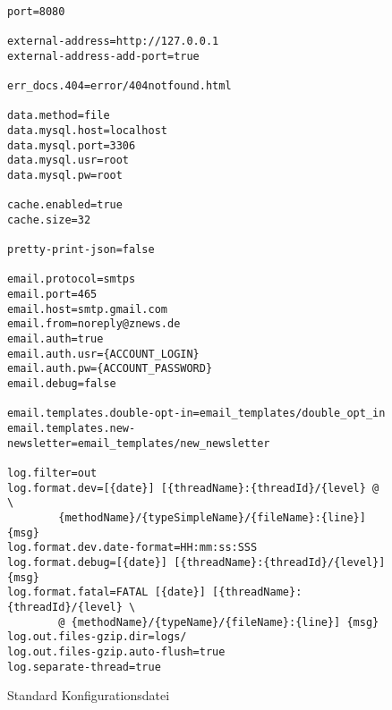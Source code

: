 \begin{figure}[p]
    \centering
    \begin{lstlisting}[frame=single,language=incomplete-Ini]%formatter:off

port=8080

external-address=http://127.0.0.1
external-address-add-port=true

err_docs.404=error/404notfound.html

data.method=file
data.mysql.host=localhost
data.mysql.port=3306
data.mysql.usr=root
data.mysql.pw=root

cache.enabled=true
cache.size=32

pretty-print-json=false

email.protocol=smtps
email.port=465
email.host=smtp.gmail.com
email.from=noreply@znews.de
email.auth=true
email.auth.usr={ACCOUNT_LOGIN}
email.auth.pw={ACCOUNT_PASSWORD}
email.debug=false

email.templates.double-opt-in=email_templates/double_opt_in
email.templates.new-newsletter=email_templates/new_newsletter

log.filter=out
log.format.dev=[{date}] [{threadName}:{threadId}/{level} @ \
        {methodName}/{typeSimpleName}/{fileName}:{line}] {msg}
log.format.dev.date-format=HH:mm:ss:SSS
log.format.debug=[{date}] [{threadName}:{threadId}/{level}] {msg}
log.format.fatal=FATAL [{date}] [{threadName}:{threadId}/{level} \
        @ {methodName}/{typeName}/{fileName}:{line}] {msg}
log.out.files-gzip.dir=logs/
log.out.files-gzip.auto-flush=true
log.separate-thread=true

    \end{lstlisting}%
    \caption{\label{fig:config-std}Standard Konfigurationsdatei}
\end{figure}


%


\End
